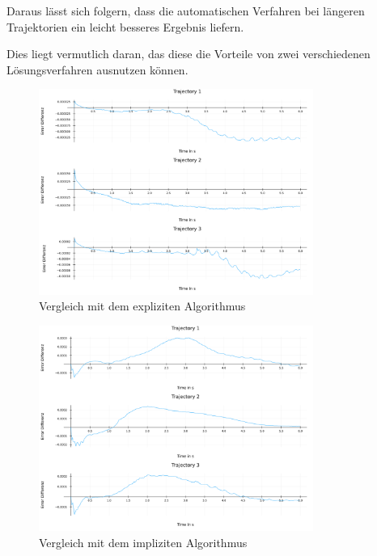 Daraus lässt sich folgern, dass die automatischen Verfahren bei längeren Trajektorien ein leicht besseres Ergebnis liefern.

Dies liegt vermutlich daran, das diese die Vorteile von 
zwei verschiedenen Lösungsverfahren ausnutzen können.

\begin{figure}[H]
    \centering
    \includegraphics[width=0.8\textwidth]{Data/03_Ergebnisse/autoswitching/errors_explizit_composit.png}
    \caption{Vergleich mit dem expliziten Algorithmus}
    \label{fig:vergleichexplizit}
\end{figure}
\begin{figure}[H]
    \centering
    \includegraphics[width=0.8\textwidth]{Data/03_Ergebnisse/autoswitching/errors_implizit_composit.png}
    \caption{Vergleich mit dem impliziten Algorithmus}
    \label{fig:vergleichimplizit}
\end{figure}

